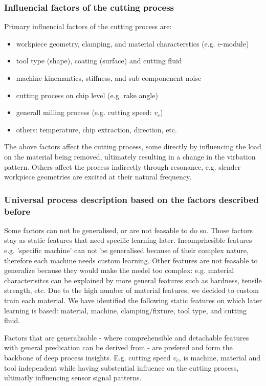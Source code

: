 \documentclass[5p,times,procedia]{elsarticle}
\begin{document}
\subsubsection{Influencial factors of the cutting process}\label{ascpect1}
Primary influencial factors of the cutting process are:
\vspace*{-\baselineskip}
	\begin{itemize}
		\item workpiece geometry, clamping, and material characterstics (e.g. e-module)
		\item tool type (shape), coating (surface) and cutting fluid
		\item machine kinemantics, stiffness, and sub componenent noise
		\item cutting process on chip level (e.g. rake angle)
		\item generall milling process (e.g. cutting speed: $v_c$)
		\item others: temperature, chip extraction, direction, etc.
	\end{itemize}	
	\vspace*{-\baselineskip}
	The above factors affect the cutting process, some directly by influencing the load on the material being removed, ultimately resulting in a change in the virbation pattern. Others affect the process indirectly through resonance, e.g. slender workpiece geometries are excited at their natural frequency.
	
\subsubsection{Universal process description based on the factors described before}\label{ascpect2}
	Some factors can not be generalised, or are not feasable to do so. Those factors stay as static features that need specific learning later.
	Incomprhesible features e.g. 'specific machine' can not be generalised because of their complex nature, therefore each machine needs custom learning.
	Other features are not feasable to generalize because they would make the medel too complex: e.g. material characterisitcs can be explained by more general features such as hardness, tensile strength, etc. Due to the high number of material features, we decided to custom train each material.
	We have identified the following static features on which later learning is based:
	material, machine, clamping/fixture, tool type, and cutting fluid.
	
	Factors that are generalisable - where comprehensible and detachable features with general predication can be derived from - are prefered and form the backbone of deep process insights. E.g. cutting speed $v_c$, is machine, material and tool independent while having substential influence on the cutting process, ultimatly influencing sensor signal patterns.
	
\end{document}
